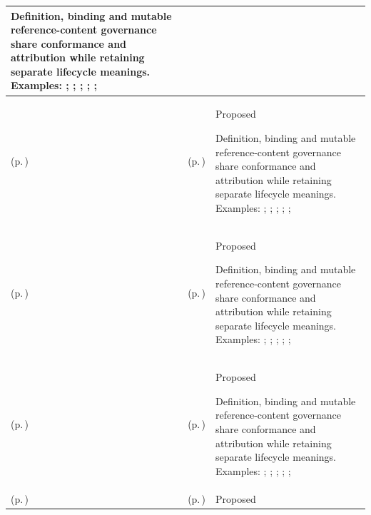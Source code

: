 \begin{longtable}{|>{\raggedright\arraybackslash}p{0.27\TableWidth}|>{\raggedright\arraybackslash}p{0.27\TableWidth}|>{\raggedright\arraybackslash}p{0.46\TableWidth}|}
Definition, binding and mutable reference-content governance share conformance and attribution while retaining separate lifecycle meanings. Examples: \nameref{feature:feat-ise-27}; \nameref{feature:feat-ise-28}; \nameref{function:govern-information-semantics}; \nameref{service:semantic-model-definition-service}; \nameref{function:govern-information-definition}; \nameref{service:information-dictionary-query}\\\hline
\nameref{cap:bec-information-design-governance} (p.\,\pageref{cap:bec-information-design-governance}) & \nameref{cap:ec-03} (p.\,\pageref{cap:ec-03}) & Proposed

Definition, binding and mutable reference-content governance share conformance and attribution while retaining separate lifecycle meanings. Examples: \nameref{feature:feat-ise-27}; \nameref{feature:feat-ise-28}; \nameref{function:govern-information-semantics}; \nameref{service:semantic-model-definition-service}; \nameref{function:govern-information-definition}; \nameref{service:information-dictionary-query}\\\hline
\nameref{cap:bec-information-design-governance} (p.\,\pageref{cap:bec-information-design-governance}) & \nameref{cap:ec-07} (p.\,\pageref{cap:ec-07}) & Proposed

Definition, binding and mutable reference-content governance share conformance and attribution while retaining separate lifecycle meanings. Examples: \nameref{feature:feat-ise-27}; \nameref{feature:feat-ise-28}; \nameref{function:govern-information-semantics}; \nameref{service:semantic-model-definition-service}; \nameref{function:govern-information-definition}; \nameref{service:information-dictionary-query}\\\hline
\nameref{cap:bec-clinical-knowledge-services} (p.\,\pageref{cap:bec-clinical-knowledge-services}) & \nameref{cap:ec-13} (p.\,\pageref{cap:ec-13}) & Proposed

Definition, binding and mutable reference-content governance share conformance and attribution while retaining separate lifecycle meanings. Examples: \nameref{feature:feat-ise-14}; \nameref{feature:feat-ise-15}; \nameref{function:resolve-clinical-concept}; \nameref{service:terminology-concept-resolution-service}; \nameref{function:map-clinical-concept}; \nameref{service:terminology-mapping-service}\\\hline
\nameref{cap:bec-clinical-knowledge-services} (p.\,\pageref{cap:bec-clinical-knowledge-services}) & \nameref{cap:ec-03} (p.\,\pageref{cap:ec-03}) & Proposed


\end{longtable}
